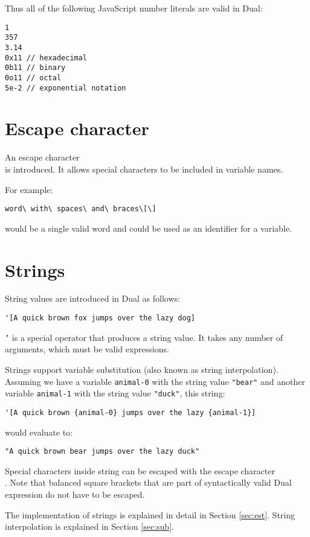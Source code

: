 Thus all of the following JavaScript number literals are valid in Dual:
\begin{lstlisting}
1
357
3.14
0x11 // hexadecimal
0b11 // binary
0o11 // octal
5e-2 // exponential notation
\end{lstlisting}

\section{Escape character}
An escape character \texttt{\\} is introduced. It allows special characters to be included in variable names.

For example:
\begin{lstlisting}
word\ with\ spaces\ and\ braces\[\]
\end{lstlisting}
would be a single valid word and could be used as an identifier for a variable.

\section{Strings}
String values are introduced in Dual as follows:
\begin{lstlisting}
'[A quick brown fox jumps over the lazy dog]
\end{lstlisting}

\texttt{'} is a special operator that produces a string value. It takes any number of arguments, which must be valid expressions.

Strings support variable substitution (also known as string interpolation\cite{string_interpolation_wikipedia}). Assuming we have a variable \texttt{animal-0} with the string value \texttt{"bear"} and another variable \texttt{animal-1} with the string value \texttt{"duck"}, this string:
\begin{lstlisting}
'[A quick brown {animal-0} jumps over the lazy {animal-1}]
\end{lstlisting}

would evaluate to:
\begin{lstlisting}
"A quick brown bear jumps over the lazy duck"
\end{lstlisting}

Special characters inside string can be escaped with the escape character \texttt{\\}. Note that balanced square brackets that are part of syntactically valid Dual expression do not have to be escaped.

The implementation of strings is explained in detail in Section \ref{sec:est}. String interpolation is explained in Section \ref{sec:sub}.

